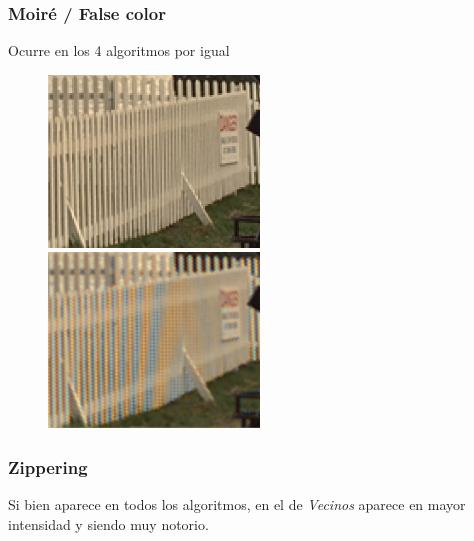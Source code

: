{\subsubsection{Moiré / False color}
Ocurre en los 4 algoritmos por igual
\begin{figure}[h]
\begin{center}
       \includegraphics[width=0.5\textwidth]{imagenes/img8_moire_original.png}
        \caption{}
        \end{center}
\endminipage
{}
\begin{center}
       \includegraphics[width=0.5\textwidth]{imagenes/img8_moire.png}
        \caption{}
         \end{center}
\endminipage
\end{figure}
\subsubsection{Zippering}

Si bien aparece en todos los algoritmos, en el de \textit{Vecinos} aparece en mayor intensidad y siendo muy notorio.

}
